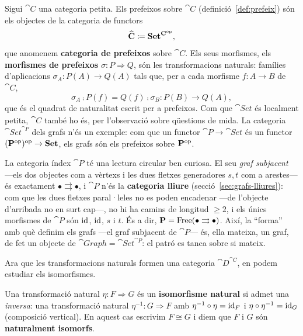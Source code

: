 \begin{exemple}\label{ex:categoria-prefeixos}
Sigui $\cat{C}$ una categoria petita. Els prefeixos sobre $\cat{C}$ (definició~\ref{def:prefeix}) són els objectes de la categoria de functors
\[
\widehat{\mathbf{C}}\coloneqq\mathbf{Set}^{\mathbf{C}^{\mathrm{op}}},
\]
que anomenem \textbf{categoria de prefeixos} sobre $\cat{C}$. Els seus morfismes, els \textbf{morfismes de prefeixos} $\sigma\colon P\Rightarrow Q$, són les transformacions naturals: famílies d'aplicacions $\sigma_A\colon P(A)\to Q(A)$ tals que, per a cada morfisme $f\colon A\to B$ de $\cat{C}$,
\[
\sigma_A\comp P(f)=Q(f)\comp\sigma_B\colon P(B)\to Q(A),
\]
que és el quadrat de naturalitat escrit per a prefeixos. Com que $\cat{Set}$ és localment petita, $\widehat{\cat{C}}$ també ho és, per l'observació sobre qüestions de mida. La categoria $\cat{Set}^{\cat{P}}$ dels grafs n'és un exemple: com que un functor $\cat{P}\to\cat{Set}$ és un functor $(\mathbf{P}^{\mathrm{op}})^{\mathrm{op}}\to\mathbf{Set}$, els grafs són els prefeixos sobre $\mathbf{P}^{\mathrm{op}}$.
\end{exemple}

\begin{observacio}
La categoria índex $\cat{P}$ té una lectura circular ben curiosa. El seu \emph{graf subjacent} ---els dos objectes com a vèrtexs i les dues fletxes generadores $s,t$ com a arestes--- és exactament $\bullet\rightrightarrows\bullet$, i $\cat{P}$ n'és la \textbf{categoria lliure} (secció~\ref{sec:grafs-lliures}): com que les dues fletxes paral·leles no es poden encadenar ---de l'objecte d'arribada no en surt cap---, no hi ha camins de longitud $\geq 2$, i els únics morfismes de $\cat{P}$ són $\operatorname{id}$, $\operatorname{id}$, $s$ i $t$. És a dir, $\mathbf{P}=\operatorname{Free}(\bullet\rightrightarrows\bullet)$. Així, la \enquote{forma} amb què definim els grafs ---el graf subjacent de $\cat{P}$--- és, ella mateixa, un graf, de fet un objecte de $\cat{Graph}=\cat{Set}^{\cat{P}}$: el patró es tanca sobre si mateix.
\end{observacio}

Ara que les transformacions naturals formen una categoria $\cat{D}^{\cat{C}}$, en podem estudiar els isomorfismes.

\begin{definicio}
Una transformació natural $\eta\colon F\Rightarrow G$ és un \textbf{isomorfisme natural} si admet una \emph{inversa}: una transformació natural $\eta^{-1}\colon G\Rightarrow F$ amb $\eta^{-1}\circ\eta=\operatorname{id}_F$ i $\eta\circ\eta^{-1}=\operatorname{id}_G$ (composició vertical). En aquest cas escrivim $F\cong G$ i diem que $F$ i $G$ són \textbf{naturalment isomorfs}.
\end{definicio}

